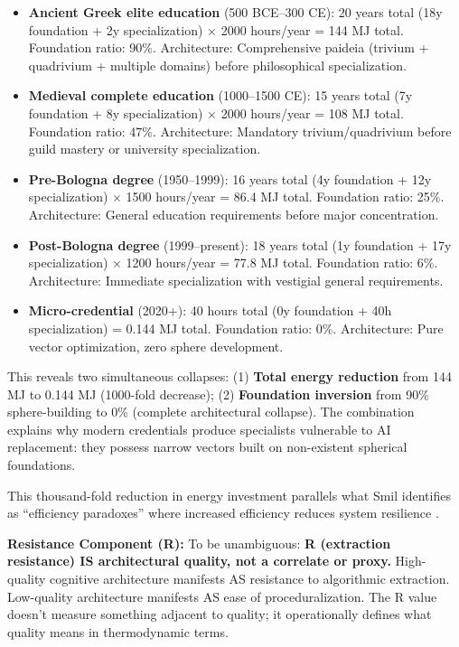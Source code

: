 \begin{itemize}
\item \textbf{Ancient Greek elite education} (500 BCE--300 CE): 20 years total (18y foundation + 2y specialization) $\times$ 2000 hours/year = 144 MJ total. Foundation ratio: 90\%. Architecture: Comprehensive paideia (trivium + quadrivium + multiple domains) before philosophical specialization.

\item \textbf{Medieval complete education} (1000--1500 CE): 15 years total (7y foundation + 8y specialization) $\times$ 2000 hours/year = 108 MJ total. Foundation ratio: 47\%. Architecture: Mandatory trivium/quadrivium before guild mastery or university specialization.

\item \textbf{Pre-Bologna degree} (1950--1999): 16 years total (4y foundation + 12y specialization) $\times$ 1500 hours/year = 86.4 MJ total. Foundation ratio: 25\%. Architecture: General education requirements before major concentration.

\item \textbf{Post-Bologna degree} (1999--present): 18 years total (1y foundation + 17y specialization) $\times$ 1200 hours/year = 77.8 MJ total. Foundation ratio: 6\%. Architecture: Immediate specialization with vestigial general requirements.

\item \textbf{Micro-credential} (2020+): 40 hours total (0y foundation + 40h specialization) = 0.144 MJ total. Foundation ratio: 0\%. Architecture: Pure vector optimization, zero sphere development.
\end{itemize}

This reveals two simultaneous collapses: (1) \textbf{Total energy reduction} from 144 MJ to 0.144 MJ (1000-fold decrease); (2) \textbf{Foundation inversion} from 90\% sphere-building to 0\% (complete architectural collapse). The combination explains why modern credentials produce specialists vulnerable to AI replacement: they possess narrow vectors built on non-existent spherical foundations.

This thousand-fold reduction in energy investment parallels what Smil identifies as ``efficiency paradoxes'' where increased efficiency reduces system resilience \citep{smil2018}.

\textbf{Resistance Component (R):} To be unambiguous: \textbf{R (extraction resistance) IS architectural quality, not a correlate or proxy.} High-quality cognitive architecture manifests AS resistance to algorithmic extraction. Low-quality architecture manifests AS ease of proceduralization. The R value doesn't measure something adjacent to quality; it operationally defines what quality means in thermodynamic terms.

